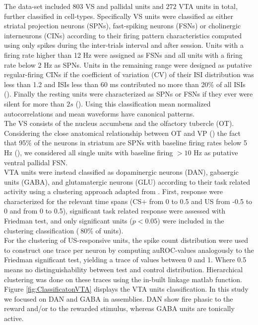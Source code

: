 The data-set included $803$ VS and pallidal units and $272$ VTA units in total, further classified in cell-types. Specifically VS units were classified as either striatal projection neurons (SPNs), fast-spiking neurons (FSNs) or cholinergic interneurons (CINs) according to their firing pattern characteristics computed using only spikes during the inter-trials interval and after session. Units with a firing rate higher than 12 Hz were assigned as FSNs and all units with a firing rate below 2 Hz as SPNs. Units in the remaining range were designed as putative regular-firing CINs if the coefficient of variation (CV) of their ISI distribution was less than 1.2 and ISIs less than 60 ms contributed no more than 20$\%$ of all ISIs (\cite{Inokawa}). Finally the resting units were characterized as SPNs or FSNs if they ever were silent for more than $2s$ (\cite{Graybiel}). Using this classification mean normalized autocorrelations and mean waveforms have canonical patterns.\\The VS consists of the nucleus accumbens and the olfactory tubercle (OT). Considering the close anatomical relationship between OT and VP (\cite{Heimer1982}) the fact that 95$\%$ of the neurons in striatum are SPNs with baseline firing rates below 5 Hz (\cite{Kravitz}), we considered all single units with baseline firing $> 10$ Hz as putative ventral pallidal FSN.\\VTA units were instead classified as dopaminergic neurons (DAN), gabaergic units (GABA), and glutamatergic neurons (GLU) according to their task related activity using a clustering approach adapted from \cite{Uchida}. First, response were characterized for the relevant time spans (CS+ from 0 to 0.5 and US from -0.5 to 0 and from 0 to 0.5), significant task related response were assessed with Friedman test, and only significant units ($p<0.05$) were included in the clustering classification ($~80\%$ of units).\\For the clustering of US-responsive units, the spike count distribution were used to construct one trace per neuron by computing auROC-values analogously to the Friedman significant test, yielding a trace of values between 0 and 1. Where 0.5 means no distinguishability between test and control distribution. Hierarchical clustering was done on these traces using the in-built linkage matlab function.\\Figure \ref{fig:ClassificatonVTA} displays the VTA units classification. In this study we focused on DAN and GABA in assemblies. DAN show fire phasic to the reward and/or to the rewarded stimulus, whereas GABA units are tonically active.
